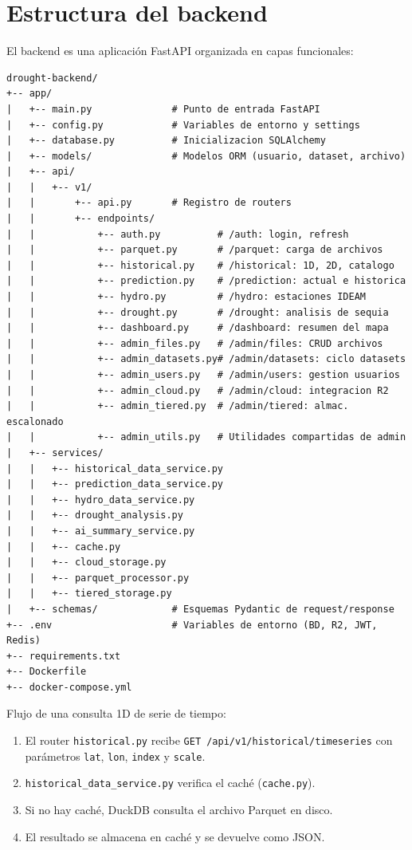 \section{Estructura del backend}
\label{sec:estructura_backend}

El backend es una aplicación FastAPI organizada en capas funcionales:

\begin{verbatim}
drought-backend/
+-- app/
|   +-- main.py              # Punto de entrada FastAPI
|   +-- config.py            # Variables de entorno y settings
|   +-- database.py          # Inicializacion SQLAlchemy
|   +-- models/              # Modelos ORM (usuario, dataset, archivo)
|   +-- api/
|   |   +-- v1/
|   |       +-- api.py       # Registro de routers
|   |       +-- endpoints/
|   |           +-- auth.py          # /auth: login, refresh
|   |           +-- parquet.py       # /parquet: carga de archivos
|   |           +-- historical.py    # /historical: 1D, 2D, catalogo
|   |           +-- prediction.py    # /prediction: actual e historica
|   |           +-- hydro.py         # /hydro: estaciones IDEAM
|   |           +-- drought.py       # /drought: analisis de sequia
|   |           +-- dashboard.py     # /dashboard: resumen del mapa
|   |           +-- admin_files.py   # /admin/files: CRUD archivos
|   |           +-- admin_datasets.py# /admin/datasets: ciclo datasets
|   |           +-- admin_users.py   # /admin/users: gestion usuarios
|   |           +-- admin_cloud.py   # /admin/cloud: integracion R2
|   |           +-- admin_tiered.py  # /admin/tiered: almac. escalonado
|   |           +-- admin_utils.py   # Utilidades compartidas de admin
|   +-- services/
|   |   +-- historical_data_service.py
|   |   +-- prediction_data_service.py
|   |   +-- hydro_data_service.py
|   |   +-- drought_analysis.py
|   |   +-- ai_summary_service.py
|   |   +-- cache.py
|   |   +-- cloud_storage.py
|   |   +-- parquet_processor.py
|   |   +-- tiered_storage.py
|   +-- schemas/             # Esquemas Pydantic de request/response
+-- .env                     # Variables de entorno (BD, R2, JWT, Redis)
+-- requirements.txt
+-- Dockerfile
+-- docker-compose.yml
\end{verbatim}

\begin{example}
Flujo de una consulta 1D de serie de tiempo:
\begin{enumerate}
    \item El router \texttt{historical.py} recibe \texttt{GET /api/v1/historical/timeseries} con parámetros \texttt{lat}, \texttt{lon}, \texttt{index} y \texttt{scale}.
    \item \texttt{historical\_data\_service.py} verifica el caché (\texttt{cache.py}).
    \item Si no hay caché, DuckDB consulta el archivo Parquet en disco.
    \item El resultado se almacena en caché y se devuelve como JSON.
\end{enumerate}
\end{example}
